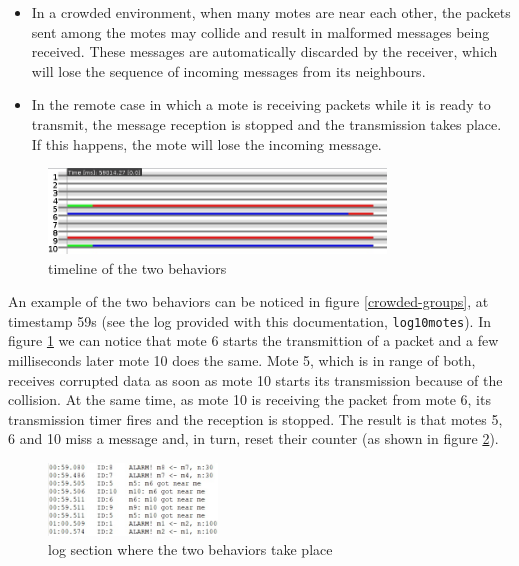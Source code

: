 \documentclass[11pt]{article}
\begin{document}
\begin{itemize}
  \item In a crowded environment, when many motes are near each other, the packets sent among the motes may collide and result in malformed messages being received. These messages are automatically discarded by the receiver, which will lose the sequence of incoming messages from its neighbours.
  \item In the remote case in which a mote is receiving packets while it is ready to transmit, the message reception is stopped and the transmission takes place. If this happens, the mote will lose the incoming message.
\end{itemize}

\begin{figure}[H]
  \centering
  \includegraphics[width=0.8\textwidth]{10-motes-timeline.jpg}
  \caption{timeline of the two behaviors}
  \label{timeline}
\end{figure}

An example of the two behaviors can be noticed in figure \ref{crowded-groups}, at timestamp 59s (see the log provided with this documentation, \texttt{log10motes}). In figure \ref{timeline} we can notice that mote 6 starts the transmittion of a packet and a few milliseconds later mote 10 does the same. Mote 5, which is in range of both, receives corrupted data as soon as mote 10 starts its transmission because of the collision. \newline
At the same time, as mote 10 is receiving the packet from mote 6, its transmission timer fires and the reception is stopped. \newline
The result is that motes 5, 6 and 10 miss a message and, in turn, reset their counter (as shown in figure \ref{log}).

\begin{figure}[H]
  \centering
  \includegraphics[width=0.40\textwidth]{LogTimeline.jpg}
  \caption{log section where the two behaviors take place}
  \label{log}  
\end{figure}
\end{document}
